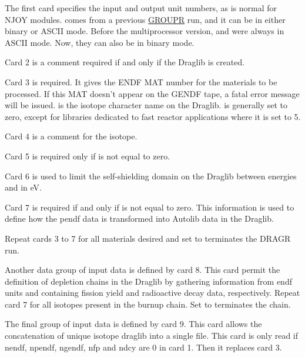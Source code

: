 The first card specifies the input and output unit numbers, as
is normal for NJOY modules.   comes from a previous
\hyperlink{sGROUPRhy}{GROUPR} run, and it can be in
either binary or ASCII mode.
Before the multiprocessor version,  and  
were always in ASCII mode. Now, they can also be in binary mode.

Card 2 is a comment required if and only if the Draglib is created.

Card 3 is required.  It gives the ENDF MAT number for
the materials to be processed.  If this MAT doesn't appear on
the GENDF tape, a fatal error message will be issued. 
is the isotope character name on the Draglib.  is
generally set to zero, except for libraries dedicated to fast
reactor applications where it is set to 5.

Card 4 is a comment for the isotope.

Card 5 is required only if  is not equal to zero.

Card 6 is used to limit the self-shielding domain on the Draglib between
energies  and  in eV.

Card 7 is required if and only if  is not equal to zero.
This information is used to define how the pendf data is transformed
into Autolib data in the Draglib.

Repeat cards 3 to 7 for all materials desired and set 
to terminates the DRAGR run.

Another data group of input data is defined by card 8. This card
permit the definition of depletion chains in the Draglib by gathering
information from endf units  and  containing
fission yield and radioactive decay data, respectively. Repeat card 7
for all isotopes present in the burnup chain. Set 
to terminates the chain.

The final group of input data is defined by card 9. This card
allows the concatenation of unique isotope draglib into a single file. 
This card is only read if nendf, npendf, ngendf, nfp and ndcy are 0 in 
card 1. Then it replaces card 3.

\cleardoublepage
